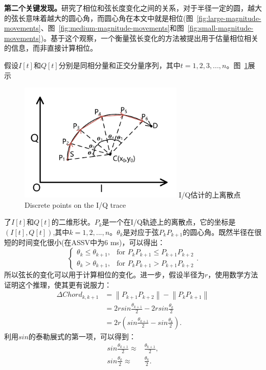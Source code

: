 \textbf{第二个关键发现。}研究了相位和弦长度变化之间的关系，对于半径一定的圆，越大的弦长意味着越大的圆心角，而圆心角在本文中就是相位(图~\ref{fig:large-magnitude-movements}、图~\ref{fig:medium-magnitude-movements}和图~\ref{fig:small-magnitude-movements})。基于这个观察，一个衡量弦长变化的方法被提出用于估量相位相关的信息，而非直接计算相位。

假设$I[t]$和$Q[t]$分别是同相分量和正交分量序列，其中$t=1,2,3,...,n$。图~\ref{fig:discrete-point-trace}展示
\begin{figure}[!htp]
  \centering
  \includegraphics[width=0.7\textwidth]{figure/estimation-geometry.pdf}
  \bicaption
    {I/Q估计的上离散点}
    {Discrete points on the I/Q trace}
  \label{fig:discrete-point-trace}
\end{figure}
了$I[t]$和$Q[t]$的二维形状。$P_k$是一个在I/Q轨迹上的离散点，它的坐标是$(I[t],Q[t])$,其中$k=1,2,...,n$。$\theta_{k}$是对应于弦$P_{k}P_{k+1}$的圆心角。既然半径在很短的时间变化很小(在ASSV中为6 ms)，可以得出：
$$
\begin{cases} 
  \theta_{k} \leq \theta_{k+1}, & \text{for } P_{k}P_{k+1} \leq P_{k+1}P_{k+2}  \\
  \theta_{k} > \theta_{k+1},  & \text{for } P_{k}P_{k+1} > P_{k+1}P_{k+2}
\end{cases}
.
$$
所以弦长的变化可以用于计算相位的变化。进一步，假设半径为$r$，使用数学方法证明这个推理，使其更有说服力：
\begin{align}
\Delta Chord_{k,k+1} &= \left\|P_{k+1}P_{k+2}\right\| - \left\|P_{k}P_{k+1}\right\|  \\ \label{eq:phase-approx}
&= 2rsin\frac{\theta_{k+1}}{2} - 2rsin\frac{\theta_{k}}{2} \nonumber \\  
&= 2r\left(sin\frac{\theta_{k+1}}{2} - sin\frac{\theta_{k}}{2}\right)  
.
\end{align}
利用$sin$的泰勒展式的第一项，可以得到：
\begin{align}
   sin\frac{\theta_{k+1}}{2} \approx & \frac{\theta_{k+1}}{2} ,\label{eq:taylor-series1}\\ 
    sin\frac{\theta_{k}}{2} \approx & \frac{\theta_{k}}{2}. \label{eq:taylor-series2}
\end{align}
